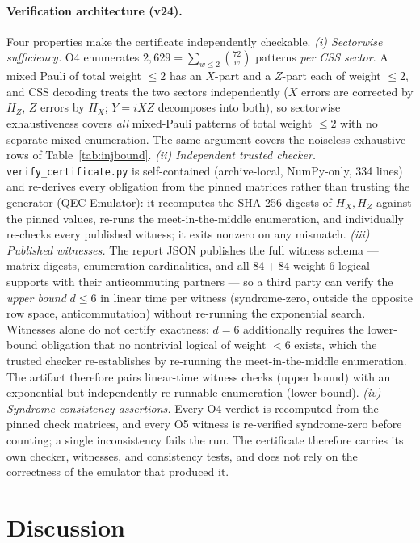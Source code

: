 \documentclass[11pt,a4paper]{article}
\begin{document}
\paragraph{Verification architecture (v24).}
Four properties make the certificate independently checkable.
\emph{(i) Sectorwise sufficiency.} O4 enumerates
$2{,}629=\sum_{w\le2}\binom{72}{w}$ patterns \emph{per CSS sector}. A
mixed Pauli of total weight $\le2$ has an $X$-part and a $Z$-part each
of weight $\le2$, and CSS decoding treats the two sectors independently
($X$ errors are corrected by $H_Z$, $Z$ errors by $H_X$; $Y=iXZ$
decomposes into both), so sectorwise exhaustiveness covers \emph{all}
mixed-Pauli patterns of total weight $\le2$ with no separate mixed
enumeration. The same argument covers the noiseless exhaustive rows of
Table~\ref{tab:injbound}.
\emph{(ii) Independent trusted checker.}
\texttt{verify\_certificate.py} is self-contained (archive-local,
NumPy-only, 334 lines) and re-derives every obligation from the pinned
matrices rather than trusting the generator (QEC Emulator): it
recomputes the SHA-256 digests of $H_X,H_Z$ against the pinned values,
re-runs the meet-in-the-middle enumeration, and individually re-checks
every published witness; it exits nonzero on any mismatch.
\emph{(iii) Published witnesses.} The report JSON publishes the full
witness schema --- matrix digests, enumeration cardinalities, and all
$84+84$ weight-6 logical supports with their anticommuting partners ---
so a third party can verify the \emph{upper bound} $d\le6$ in linear
time per witness (syndrome-zero, outside the opposite row space,
anticommutation) without re-running the exponential search. Witnesses
alone do not certify exactness: $d=6$ additionally requires the
lower-bound obligation that no nontrivial logical of weight $<6$
exists, which the trusted checker re-establishes by re-running the
meet-in-the-middle enumeration. The artifact therefore pairs
linear-time witness checks (upper bound) with an exponential but
independently re-runnable enumeration (lower bound).
\emph{(iv) Syndrome-consistency assertions.} Every O4 verdict is
recomputed from the pinned check matrices, and every O5 witness is
re-verified syndrome-zero before counting; a single inconsistency fails
the run. The certificate therefore carries its own checker, witnesses,
and consistency tests, and does not rely on the correctness of the
emulator that produced it.

\section{Discussion}
\end{document}
